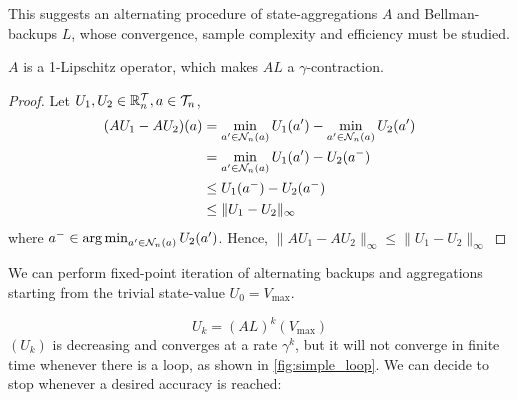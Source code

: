 \documentclass{article}
\begin{document}
This suggests an alternating procedure of state-aggregations $A$ and Bellman-backups $L$, whose convergence, sample complexity and efficiency must be studied.

\begin{proposition}[Contractivity of $AL$]
$A$ is a 1-Lipschitz operator, which makes $AL$ a $\gamma$-contraction.
\end{proposition}
\begin{proof}
Let $U_1, U_2\in \mathbb{R}^{\mathcal{T}}_n, a\in\mathcal{T}_n$,
\begin{align*}
    (AU_1 - AU_2)(a) &= \min_{a'\in\mathcal{N}_n(a)} U_1(a') - \min_{a'\in\mathcal{N}_n(a)} U_2(a') \\
    &= \min_{a'\in\mathcal{N}_n(a)} U_1(a') - U_2(a^-) \\
    &\leq U_1(a^-) - U_2(a^-) \\
    &\leq \|U_1 - U_2\|_\infty
\end{align*}
where $a^-\in \operatorname*{arg\,min}_{a'\in\mathcal{N}_n(a)} U_2(a')$. 
Hence, $\|AU_1 - AU_2\|_\infty \leq \|U_1 - U_2\|_\infty$
\end{proof}

We can perform fixed-point iteration of alternating backups and aggregations starting from the trivial state-value $U_0 = V_{\max}$.

\begin{equation}
    \label{eq:recursion}
    U_k = (AL)^k(V_{\max})
\end{equation}
$(U_k)$ is decreasing and converges at a rate $\gamma^k$, but it will not converge in finite time whenever there is a loop, as shown in \autoref{fig:simple_loop}. We can decide to stop whenever a desired accuracy is reached: 
\end{document}
